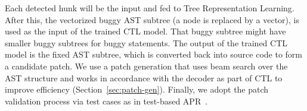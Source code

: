 Each detected hunk will be the input and fed to Tree
Representation Learning.
%
After this, the vectorized buggy AST subtree (a node is replaced by a
vector), is used as the input of the trained CTL model. That buggy
subtree might have smaller buggy subtrees for buggy statements.  The
output of the trained CTL model is the fixed AST subtree, which is
converted back into source code to form a candidate patch. We use a
patch generation that uses beam search over the AST structure and
works in accordance with the decoder as part of CTL to improve
efficiency (Section~\ref{sec:patch-gen}). Finally, we adopt the patch
validation process via test cases as in test-based APR~\cite{icse20}.




